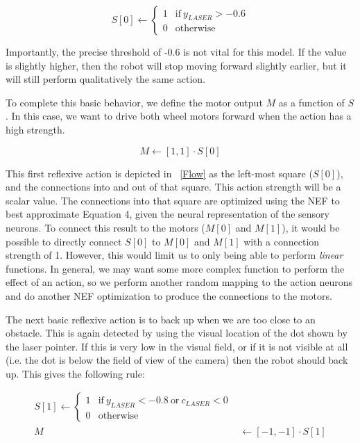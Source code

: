 \documentclass{frontiersSCNS}
\begin{document}
\begin{equation}
    S[0] \leftarrow \left \{ \begin{array}{ll}
            1 & \text{if}~y_{LASER} > -0.6 \\
               0 & \text{otherwise}
    \end{array} \right.
\end{equation}

Importantly, the precise threshold of -0.6 is not vital for this model.  If the
value is slightly higher, then the robot will stop moving forward slightly
earlier, but it will still perform qualitatively the same action.  

To complete this basic behavior, we define the motor output $M$ as a 
function of $S$. In this case, we want to drive both wheel motors forward 
when the action has a high strength.

\begin{equation}
    M \leftarrow [1, 1] \cdot S[0]
\end{equation}

This first reflexive action is depicted in \figurename~\ref{Flow} as the left-most
square ($S[0]$), and the connections into and out of that square.  This action
strength will be a scalar value.  The connections
into that square are optimized using the NEF to best approximate Equation 4,
given the neural representation of the sensory neurons.  To connect this result
to the motors ($M[0]$ and $M[1]$), it would be possible to directly connect
$S[0]$ to $M[0]$ and $M[1]$ with a connection strength of 1.  However, this
would limit us to only being able to perform \textit{linear} functions.  In
general, we may want some more complex function to perform the effect of an
action, so we perform another random mapping to the action neurons and do
another NEF optimization to produce the connections to the motors. 

The next basic reflexive action is to back up when we are too close to an 
obstacle. This is again detected by using the visual location of the dot
shown by the laser pointer.  If this is very low in the visual field, or if
it is not visible at all (i.e. the dot is below the field of view of the camera)
then the robot should back up.  This gives the following rule:

\begin{equation}
    \begin{split}
    S[1] \leftarrow \left \{ \begin{array}{ll}
            1 & \text{if}~y_{LASER} < -0.8 ~\text{or}~ c_{LASER}<0 \\
               0 & \text{otherwise}
    \end{array} \right. \\
       M & \leftarrow [-1, -1] \cdot S[1]
    \end{split}
\end{equation}
\end{document}
